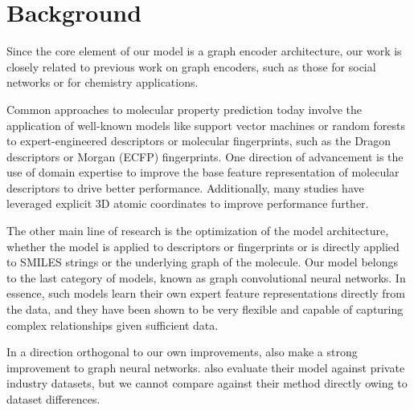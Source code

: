 \documentclass[journal=jcisd8,manuscript=article]{achemso}
\begin{document}
\section{Background}


Since the core element of our model is a graph encoder architecture, our work is closely related to previous work on graph encoders, such as those for social networks\cite{kipf2016semi,hamilton2017inductive} or for chemistry applications\cite{scarselli2009graph,bruna2013spectral,duvenaud2015convolutional,henaff2015deep,dai2016discriminative,defferrard2016convolutional,lei2017deriving,coley_convolutional_2017,kusner2017grammar,gomez2018automatic,jin2018junction,jin2018learning}.

Common approaches to molecular property prediction today involve the application of well-known models like support vector machines\cite{cortes1995support} or random forests\cite{breiman2001random} to expert-engineered descriptors or molecular fingerprints, such as the Dragon descriptors\cite{mauri2006dragon} or Morgan (ECFP) fingerprints\cite{rogers2010extended}. One direction of advancement is the use of domain expertise to improve the base feature representation of molecular descriptors\cite{swamidass2005kernels,cao2013chemopy,durant2002reoptimization,moriwaki2018mordred,mauri2006dragon} to drive better performance\cite{mayr2018chembl}. Additionally, many studies have leveraged explicit 3D atomic coordinates to improve performance further\cite{Wu_2018,schutt2017schnet,kondor2018covariant,faber2017machine,feinberg2018potentialnet}.


The other main line of research is the optimization of the model architecture, whether the model is applied to descriptors or fingerprints\cite{mayr2018chembl,Lee201810847} or is directly applied to SMILES\cite{weininger1988smiles} strings\cite{mayr2018chembl} or the underlying graph of the molecule\cite{duvenaud2015convolutional,Wu_2018,kearnes2016molecular,gilmer2017neural,li2015gated,kipf2016semi,defferrard2016convolutional,coley_convolutional_2017,bruna2013spectral,schutt2017quantum,battaglia2016interaction}. Our model belongs to the last category of models, known as graph convolutional neural networks. In essence, such models learn their own expert feature representations directly from the data, and they have been shown to be very flexible and capable of capturing complex relationships given sufficient data\cite{gilmer2017neural,Wu_2018}. 

In a direction orthogonal to our own improvements, \citeauthor{ishiguro2019graph}\cite{ishiguro2019graph} also make a strong improvement to graph neural networks. \citeauthor{liu2018chemi}\cite{liu2018chemi} also evaluate their model against private industry datasets, but we cannot compare against their method directly owing to dataset differences\cite{liu2018chemi}. 
 
\end{document}
